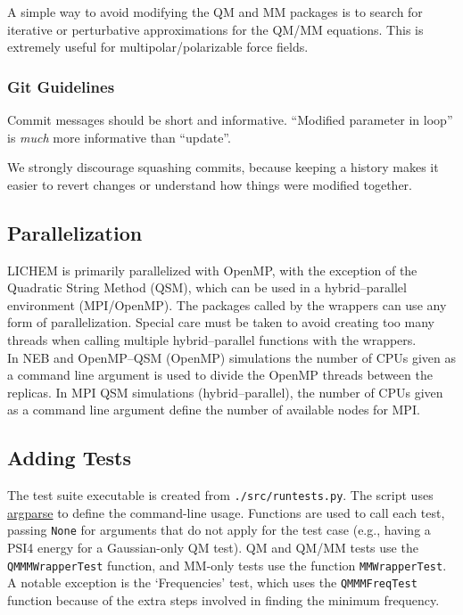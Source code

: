 \documentclass[12pt]{report}
\begin{document}
A simple way to avoid modifying the QM and MM packages is to search for
iterative or perturbative approximations for the QM/MM equations.
This is extremely useful for multipolar/polarizable force fields. \\

\subsubsection{Git Guidelines}

Commit messages should be short and informative.
``Modified parameter in loop'' is \emph{much} more informative than ``update''.

We strongly discourage squashing commits, because keeping a history makes it
easier to revert changes or understand how things were modified together.

\subsection{Parallelization}

LICHEM is primarily parallelized with OpenMP, with the exception
of the Quadratic String Method (QSM), which can be used in a
hybrid--parallel environment (MPI/OpenMP).  The packages called by the
wrappers can use any form of parallelization.
Special care must be taken to avoid creating too many threads when calling
multiple hybrid--parallel functions with the wrappers. \\

In NEB and OpenMP--QSM (OpenMP) simulations the number of CPUs given as a
command line argument is used to divide the OpenMP threads between the
replicas.
In MPI QSM simulations (hybrid--parallel), the number of CPUs given as a
command line argument define the number of available nodes for MPI.

\subsection{Adding Tests}\label{subsec:add-tests}

The test suite executable is created from \texttt{./src/runtests.py}.
The script uses
\href{https://docs.python.org/3.10/library/argparse.html}{argparse}
to define the command-line usage.
Functions are used to call each test, passing \texttt{None} for
arguments that do not apply for the test case (e.g., having a
PSI4 energy for a Gaussian-only QM test).
QM and QM/MM tests use the \texttt{QMMMWrapperTest} function,
and MM-only tests use the function \texttt{MMWrapperTest}.
A notable exception is the `Frequencies' test, which uses the
\texttt{QMMMFreqTest} function because of the extra steps involved
in finding the minimum frequency. \\
\end{document}
